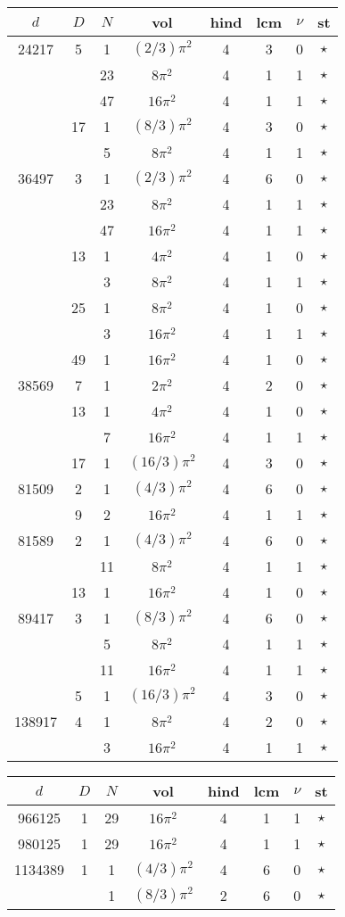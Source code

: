\documentclass[12pt]{amsart}
\begin{document}
\begin{tabular}{ccc|ccccc}
$d$ & $D$ & $N$ & vol & hind & lcm & $\nu$ & st\\
\hline
24217 & 5 & 1 & $(2/3)\pi^2$ & 4 & 3 & 0 & $\star$ \\
 &  & 23 & $8\pi^2$ & 4 & 1 & 1 & $\star$ \\
 &  & 47 & $16\pi^2$ & 4 & 1 & 1 & $\star$ \\
 & 17 & 1 & $(8/3)\pi^2$ & 4 & 3 & 0 & $\star$ \\
 &  & 5 & $8\pi^2$ & 4 & 1 & 1 & $\star$ \\
36497 & 3 & 1 & $(2/3)\pi^2$ & 4 & 6 & 0 & $\star$ \\
 &  & 23 & $8\pi^2$ & 4 & 1 & 1 & $\star$ \\
 &  & 47 & $16\pi^2$ & 4 & 1 & 1 & $\star$ \\
 & 13 & 1 & $4\pi^2$ & 4 & 1 & 0 & $\star$ \\
 &  & 3 & $8\pi^2$ & 4 & 1 & 1 & $\star$ \\
 & 25 & 1 & $8\pi^2$ & 4 & 1 & 0 & $\star$ \\
 &  & 3 & $16\pi^2$ & 4 & 1 & 1 & $\star$ \\
 & 49 & 1 & $16\pi^2$ & 4 & 1 & 0 & $\star$ \\
38569 & 7 & 1 & $2\pi^2$ & 4 & 2 & 0 & $\star$ \\
 & 13 & 1 & $4\pi^2$ & 4 & 1 & 0 & $\star$ \\
 &  & 7 & $16\pi^2$ & 4 & 1 & 1 & $\star$ \\
 & 17 & 1 & $(16/3)\pi^2$ & 4 & 3 & 0 & $\star$ \\
81509 & 2 & 1 & $(4/3)\pi^2$ & 4 & 6 & 0 & $\star$ \\
 & 9 & 2 & $16\pi^2$ & 4 & 1 & 1 & $\star$ \\
81589 & 2 & 1 & $(4/3)\pi^2$ & 4 & 6 & 0 & $\star$ \\
 &  & 11 & $8\pi^2$ & 4 & 1 & 1 & $\star$ \\
 & 13 & 1 & $16\pi^2$ & 4 & 1 & 0 & $\star$ \\
89417 & 3 & 1 & $(8/3)\pi^2$ & 4 & 6 & 0 & $\star$ \\
 &  & 5 & $8\pi^2$ & 4 & 1 & 1 & $\star$ \\
 &  & 11 & $16\pi^2$ & 4 & 1 & 1 & $\star$ \\
 & 5 & 1 & $(16/3)\pi^2$ & 4 & 3 & 0 & $\star$ \\
138917 & 4 & 1 & $8\pi^2$ & 4 & 2 & 0 & $\star$ \\
 &  & 3 & $16\pi^2$ & 4 & 1 & 1 & $\star$ \\
\end{tabular}

\begin{tabular}{ccc|ccccc}
$d$ & $D$ & $N$ & vol & hind & lcm & $\nu$ & st\\
\hline
966125 & 1 & 29 & $16\pi^2$ & 4 & 1 & 1 & $\star$ \\
980125 & 1 & 29 & $16\pi^2$ & 4 & 1 & 1 & $\star$ \\
1134389 & 1 & 1 & $(4/3)\pi^2$ & 4 & 6 & 0 & $\star$ \\
 &  & 1 & $(8/3)\pi^2$ & 2 & 6 & 0 & $\star$ \\
\end{tabular}
\end{document}
